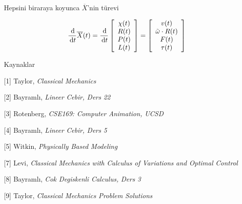 \documentclass[12pt,fleqn]{article}\usepackage{../../common}
\begin{document}
Hepsini biraraya koyunca $\overline{X}$'nin türevi

$$
\frac{\,\mathrm{d}}{\,\mathrm{d} t} \overline{X}(t) =
\frac{\,\mathrm{d}}{\,\mathrm{d} t}
\left[\begin{array}{c}
\chi(t) \\ R(t) \\ P(t) \\ L(t)
\end{array}\right]
=
\left[\begin{array}{c}
v(t) \\ \tilde \omega \cdot R(t) \\ F(t) \\ \tau(t)
\end{array}\right]
$$

Kaynaklar

[1] Taylor, {\em Classical Mechanics}

[2] Bayramlı, {\em Lineer Cebir, Ders 22}

[3] Rotenberg, {\em CSE169: Computer Animation, UCSD}

[4] Bayramlı, {\em Lineer Cebir, Ders 5}

[5] Witkin, {\em Physically Based Modeling}

[7] Levi, {\em Classical Mechanics with Calculus of Variations and Optimal Control}

[8] Bayramlı, {\em Cok Degiskenli Calculus, Ders 3}
    
[9] Taylor, {\em Classical Mechanics Problem Solutions}
\end{document}
